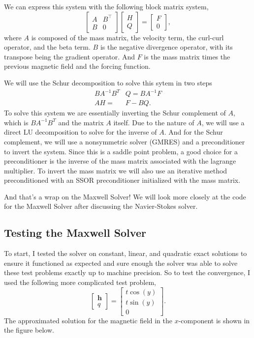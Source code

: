 \documentclass{article}
\begin{document}
        We can express this system with the following block matrix system,
        \[ \begin{bmatrix} A & B^\top \\ B & 0 \end{bmatrix} \begin{bmatrix} H \\ Q \end{bmatrix} = \begin{bmatrix} F \\ 0 \end{bmatrix}, \]
            where $A$ is composed of the mass matrix, the velocity term, the curl-curl operator, and the beta term. $B$ is the negative divergence operator, with its transpose being the gradient operator. And $F$ is the mass matrix times the previous magnetic field and the forcing function.

            We will use the Schur decomposition to solve this sytem in two steps
            \begin{align*}
                BA^{-1}B^T &Q = BA^{-1}F \\
                A H =& F - BQ.
            \end{align*}
            To solve this system we are essentially inverting the Schur complement of $A$, which is $BA^{-1}B^T$ and the matrix $A$ itself. Due to the nature of $A$, we will use a direct LU decomposition to solve for the inverse of $A$. And for the Schur complement, we will use a nonsymmetric solver (GMRES) and a preconditioner to invert the system. Since this is a saddle point problem, a good choice for a preconditioner is the inverse of the mass matrix associated with the lagrange multiplier. To invert the mass matrix we will also use an iterative method preconditioned with an SSOR preconditioner initialized with the mass matrix. 

            And that's a wrap on the Maxwell Solver! We will look more closely at the code for the Maxwell Solver after discussing the Navier-Stokes solver. 

            \subsection*{Testing the Maxwell Solver}
            To start, I tested the solver on constant, linear, and quadratic exact solutions to ensure it functioned as expected and sure enough the solver was able to solve these test problems exactly up to machine precision. So to test the convergence, I used the following more complicated test problem,
            \[ \begin{bmatrix} \boldsymbol{h} \\ q\end{bmatrix} = \begin{bmatrix} t \cos(y) \\ t \sin(y) \\ 0 \end{bmatrix}.\]
                The approximated solution for the magnetic field in the $x$-component is shown in the figure below.
\end{document}
